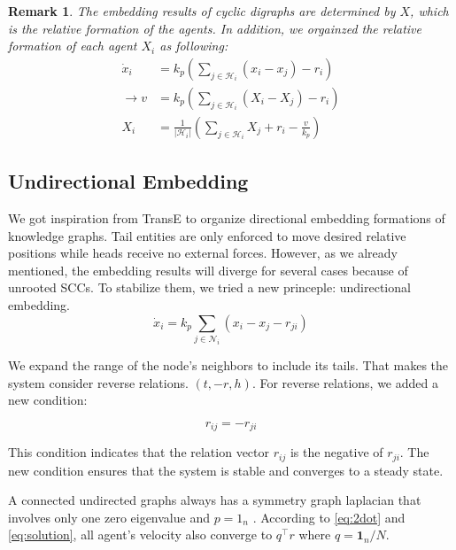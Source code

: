 \documentclass[letterpaper, 10 pt, conference]{ieeeconf}  %
\newtheorem{remark}{Remark}
\begin{document}
\begin{remark}
    The embedding results of cyclic digraphs are determined by \(X\), which is the relative formation of the agents. In addition, we orgainzed the relative formation of each agent \(X_i\) as following:
    \begin{equation}
        \begin{split}
        \dot{x}_i &= k_p(\sum_{j \in \mathcal{H}_i} (x_i - x_j) -r_i) \\
        \rightarrow v &= k_p(\sum_{j \in \mathcal{H}_i} (X_i - X_j) - r_i) \\
        X_i &= \frac{1}{|\mathcal{H}_i|}(\sum_{j \in \mathcal{H}_i} X_j +r_i-\frac{v}{k_p})
        \end{split}
    \end{equation}
\end{remark}



\subsection{Undirectional Embedding} 
We got inspiration from TransE to organize directional embedding formations of knowledge graphs. Tail entities are only enforced to move desired relative positions while heads receive no external forces. However, as we already mentioned, the embedding results will diverge for several cases because of unrooted SCCs. To stabilize them, we tried a new princeple: undirectional embedding.
\begin{equation}
    \dot{x}_i = k_p \sum_{j \in \mathcal{N}_i} (x_i - x_j - r_{ji})
\end{equation}

We expand the range of the node's neighbors to include its tails. That makes the system consider reverse relations. \( (t, -r, h) \). For reverse relations, we added a new condition: 

\[ r_{ij} = -r_{ji} \]

\noindent This condition indicates that the relation vector \( r_{ij} \) is the negative of \( r_{ji} \). The new condition ensures that the system is stable and converges to a steady state.

A connected undirected graphs always has a symmetry graph laplacian that involves only one zero eigenvalue and \( p = 1_n \) \cite{olfati-saber_consensus_2007}. According to \eqref{eq:2dot} and \eqref{eq:solution}, all agent's velocity also converge to \(q^\top r\) where \(q = \mathbf{1}_n / N \). 
\end{document}
